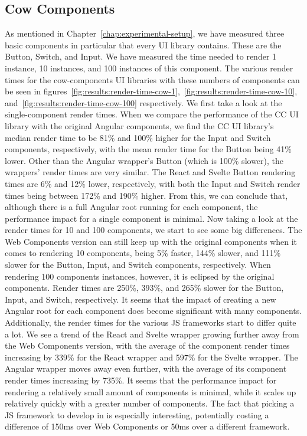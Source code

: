 \subsection{Cow Components}
As mentioned in Chapter~\ref{chap:experimental-setup}, we have measured three basic components in particular that every UI library contains. These are the Button, Switch, and Input. We have measured the time needed to render 1 instance, 10 instances, and 100 instances of this component. The various render times for the cow-components UI libraries with these numbers of components can be seen in figures~\ref{fig:results:render-time-cow-1},~\ref{fig:results:render-time-cow-10}, and~\ref{fig:results:render-time-cow-100} respectively. We first take a look at the single-component render times. When we compare the performance of the CC UI library with the original Angular components, we find the CC UI library's median render time to be 81\% and 100\% higher for the Input and Switch components, respectively, with the mean render time for the Button being 41\% lower. Other than the Angular wrapper's Button (which is 100\% slower), the wrappers' render times are very similar. The React and Svelte Button rendering times are 6\% and 12\% lower, respectively, with both the Input and Switch render times being between 172\% and 190\% higher. From this, we can conclude that, although there is a full Angular root running for each component, the performance impact for a single component is minimal. Now taking a look at the render times for 10 and 100 components, we start to see some big differences. The Web Components version can still keep up with the original components when it comes to rendering 10 components, being 5\% faster, 144\% slower, and 111\% slower for the Button, Input, and Switch components, respectively. When rendering 100 components instances, however, it is eclipsed by the original components. Render times are 250\%, 393\%, and 265\% slower for the Button, Input, and Switch, respectively. It seems that the impact of creating a new Angular root for each component does become significant with many components.
Additionally, the render times for the various JS frameworks start to differ quite a lot. We see a trend of the React and Svelte wrapper growing further away from the Web Components version, with the average of the component render times increasing by 339\% for the React wrapper and 597\% for the Svelte wrapper. The Angular wrapper moves away even further, with the average of its component render times increasing by 735\%. It seems that the performance impact for rendering a relatively small amount of components is minimal, while it scales up relatively quickly with a greater number of components. The fact that picking a JS framework to develop in is especially interesting, potentially costing a difference of 150ms over Web Components or 50ms over a different framework.

